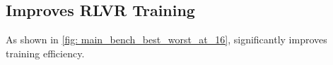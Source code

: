 \subsection{\alg Improves RLVR Training}

As shown in \cref{fig: main_bench_best_worst_at_16}, \alg significantly improves training efficiency. 
